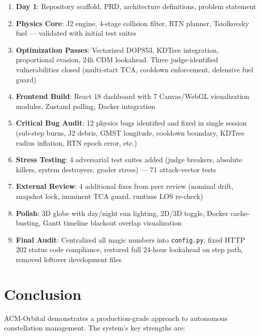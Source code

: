 \documentclass[11pt,a4paper]{article}
\begin{document}
\begin{enumerate}[nosep]
  \item \textbf{Day 1}: Repository scaffold, PRD, architecture definitions, problem statement
  \item \textbf{Physics Core}: J2 engine, 4-stage collision filter, RTN planner, Tsiolkovsky fuel ---
        validated with initial test suites
  \item \textbf{Optimization Passes}: Vectorized DOP853, KDTree integration, proportional evasion,
        24h CDM lookahead. Three judge-identified vulnerabilities closed (multi-start TCA,
        cooldown enforcement, defensive fuel guard)
  \item \textbf{Frontend Build}: React 18 dashboard with 7 Canvas/WebGL visualization modules,
        Zustand polling, Docker integration
  \item \textbf{Critical Bug Audit}: 12 physics bugs identified and fixed in single session
        (sub-step burns, J2 debris, GMST longitude, cooldown boundary, KDTree radius inflation,
        RTN epoch error, etc.)
  \item \textbf{Stress Testing}: 4 adversarial test suites added (judge breakers, absolute killers,
        system destroyers, grader stress) --- 71 attack-vector tests
  \item \textbf{External Review}: 4 additional fixes from peer review (nominal drift, snapshot lock,
        imminent TCA guard, runtime LOS re-check)
  \item \textbf{Polish}: 3D globe with day/night sun lighting, 2D/3D toggle, Docker cache-busting,
        Gantt timeline blackout overlap visualization
  \item \textbf{Final Audit}: Centralized all magic numbers into \texttt{config.py}, fixed HTTP 202
        status code compliance, restored full 24-hour lookahead on step path, removed
        leftover development files
\end{enumerate}

\section{Conclusion}

ACM-Orbital demonstrates a production-grade approach to autonomous
constellation management. The system's key strengths are:
\end{document}
